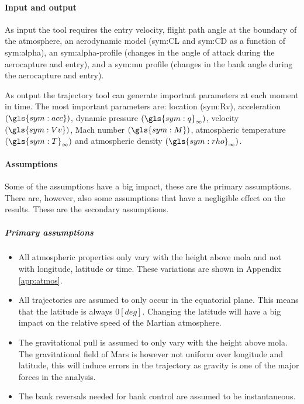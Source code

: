 \paragraph{Input and output}
As input the tool requires the entry velocity, flight path angle at the boundary of the atmosphere, an aerodynamic model (\gls{sym:CL} and \gls{sym:CD} as a function of \gls{sym:alpha}), an \gls{sym:alpha}-profile (changes in the angle of attack during the aerocapture and entry), and a \gls{sym:mu} profile (changes in the bank angle during the aerocapture and entry).

As output the trajectory tool can generate important parameters at each moment in time. The most important parameters are: location (\gls{sym:Rv}), acceleration $\left(\gls{sym:acc}\right)$, dynamic pressure $\left(\gls{sym:q}_{\infty}\right)$, velocity $\left(\gls{sym:Vv}\right)$, Mach number $\left(\gls{sym:M}\right)$, atmospheric temperature $\left(\gls{sym:T}_{\infty}\right)$ and atmospheric density $\left(\gls{sym:rho}_{\infty}\right)$.

\paragraph{Assumptions}
 \label{sec:astroassumption}
 Some of the assumptions have a big impact, these are the primary assumptions. There are, however, also some assumptions that have a negligible effect on the results. These are the secondary assumptions.
 
 \subparagraph{Primary assumptions}
 \begin{itemize}
 \item All atmospheric properties only vary with the height above \gls{mola} and not with longitude, latitude or time. These variations are shown in Appendix \ref{app:atmos}. 
 \item All trajectories are assumed to only occur in the equatorial plane. This means that the latitude is always $0 \left[deg\right]$. Changing the latitude will have a big impact on the relative speed of the Martian atmosphere.
 \item The gravitational pull is assumed to only vary with the height above \gls{mola}. The gravitational field of Mars is however not uniform over longitude and latitude, this will induce errors in the trajectory as gravity is one of the major forces in the analysis.
 \item The bank reversals needed for bank control are assumed to be instantaneous.
 \end{itemize}

